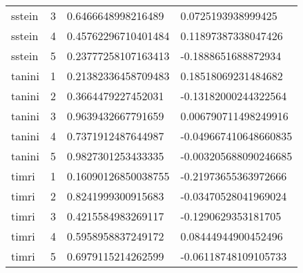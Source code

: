 \begin{longtable}{@{}lcll@{}}
      sstein & 3 & 0.6466648998216489 & 0.0725193938999425 \\
      sstein & 4 & 0.45762296710401484 & 0.11897387338047426 \\
      sstein & 5 & 0.23777258107163413 & -0.1888651688872934 \\
      tanini & 1 & 0.21382336458709483 & 0.18518069231484682 \\
      tanini & 2 & 0.3664479227452031 & -0.13182000244322564 \\
      tanini & 3 & 0.9639432667791659 & 0.006790711498249916 \\
      tanini & 4 & 0.7371912487644987 & -0.049667410648660835 \\
      tanini & 5 & 0.9827301253433335 & -0.003205688090246685 \\
      timri & 1 & 0.16090126850038755 & -0.21973655363972666 \\
      timri & 2 & 0.8241999300915683 & -0.03470528041969024 \\
      timri & 3 & 0.4215584983269117 & -0.1290629353181705 \\
      timri & 4 & 0.5958958837249172 & 0.08444944900452496 \\
      timri & 5 & 0.6979115214262599 & -0.06118748109105733\\
    \end{longtable}
    
    \newpage{}

